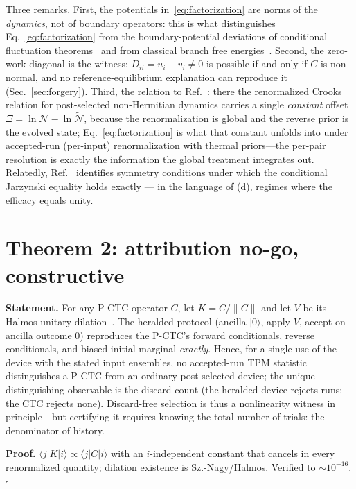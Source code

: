 \documentclass[aps,pra,twocolumn,superscriptaddress,nofootinbib]{revtex4-2}
\begin{document}
Three remarks. First, the potentials in~\eqref{eq:factorization} are norms of the \emph{dynamics}, not of boundary operators: this is what distinguishes Eq.~\eqref{eq:factorization} from the boundary-potential deviations of conditional fluctuation theorems~\cite{aberg2018,kwonkim2019} and from classical branch free energies~\cite{junier2009}. Second, the zero-work diagonal is the witness: $D_{ii}=u_i-v_i\neq 0$ is possible if and only if $C$ is non-normal, and no reference-equilibrium explanation can reproduce it (Sec.~\ref{sec:forgery}). Third, the relation to Ref.~\cite{cavina2026}: there the renormalized Crooks relation for post-selected non-Hermitian dynamics carries a single \emph{constant} offset $\Xi=\ln\mathcal{N}-\ln\tilde{\mathcal{N}}$, because the renormalization is global and the reverse prior is the evolved state; Eq.~\eqref{eq:factorization} is what that constant unfolds into under accepted-run (per-input) renormalization with thermal priors---the per-pair resolution is exactly the information the global treatment integrates out. Relatedly, Ref.~\cite{nhje2026} identifies symmetry conditions under which the conditional Jarzynski equality holds exactly --- in the language of (d), regimes where the efficacy equals unity.

\section{Theorem 2: attribution no-go, constructive}
\textbf{Statement.} For any P-CTC operator $C$, let $K=C/\lVert C\rVert$ and let $V$ be its Halmos unitary dilation~\cite{sznagy2010}. The heralded protocol (ancilla $|0\rangle$, apply $V$, accept on ancilla outcome $0$) reproduces the P-CTC's forward conditionals, reverse conditionals, and biased initial marginal \emph{exactly}. Hence, for a single use of the device with the stated input ensembles, no accepted-run TPM statistic distinguishes a P-CTC from an ordinary post-selected device; the unique distinguishing observable is the discard count (the heralded device rejects runs; the CTC rejects none). Discard-free selection is thus a nonlinearity witness in principle---but certifying it requires knowing the total number of trials: the denominator of history.

\textbf{Proof.} $\langle j|K|i\rangle\propto\langle j|C|i\rangle$ with an $i$-independent constant that cancels in every renormalized quantity; dilation existence is Sz.-Nagy/Halmos. Verified to $\sim10^{-16}$. $\square$
\end{document}
